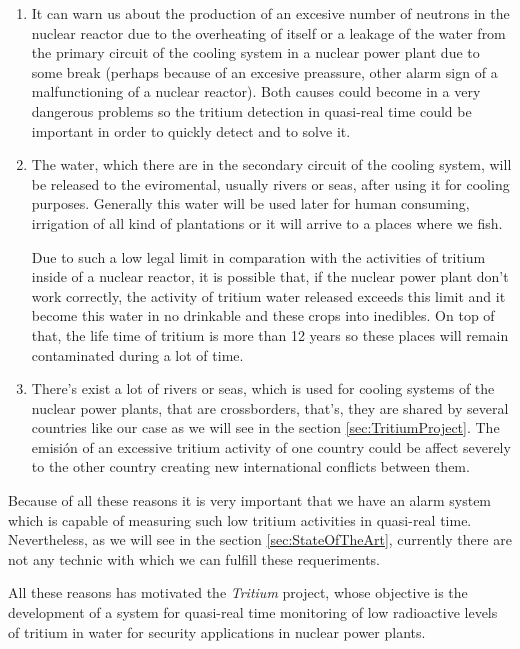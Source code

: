 \begin{enumerate}

\item{} It can warn us about the production of an excesive number of neutrons in the nuclear reactor due to the overheating of itself or a leakage of the water from the primary circuit of the cooling system in a nuclear power plant due to some break (perhaps because of an excesive preassure, other alarm sign of a malfunctioning of a nuclear reactor). Both causes could become in a very dangerous problems so the tritium detection in quasi-real time could be important in order to quickly detect and to solve it.

\item{} The water, which there are in the secondary circuit of the cooling system, will be released to the eviromental, usually rivers or seas, after using it for cooling purposes. Generally this water will be used later for human consuming, irrigation of all kind of plantations or it will arrive to a places where we fish. 

Due to such a low legal limit in comparation with the activities of tritium inside of a nuclear reactor, it is possible that, if the nuclear power plant don't work correctly, the activity of tritium water released exceeds this limit and it become this water in no drinkable and these crops into inedibles. On top of that, the life time of tritium is more than 12 years so these places will remain contaminated during a lot of time. 

\item{} There's exist a lot of rivers or seas, which is used for cooling systems of the nuclear power plants, that are crossborders, that's, they are shared by several countries like our case as we will see in the section \ref{sec:TritiumProject}. The emisión of an excessive tritium activity of one country could be affect severely to the other country creating new international conflicts between them.

\end{enumerate}

Because of all these reasons it is very important that we have an alarm system which is capable of measuring such low tritium activities in quasi-real time. Nevertheless, as we will see in the section \ref{sec:StateOfTheArt}, currently there are not any technic with which we can fulfill these requeriments.

All these reasons has motivated the \textit{Tritium} project, whose objective is the development of a system for quasi-real time monitoring of low radioactive levels of tritium in water for security applications in nuclear power plants.